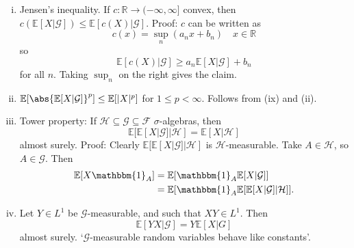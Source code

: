 \documentclass{article}
\newcommand{\G}{\mathcal{G}}
\newcommand{\1}[1]{\mathbbm{1}_{#1}}
\newcommand{\E}{\mathbb{E}}
\begin{document}
\begin{enumerate}[(i)]
  \item Jensen's inequality. If $c: \mathbb{R} \to (-\infty, \infty]$ convex, then $c(\E[X | \G]) \leq \E[c(X) | \G]$. Proof: $c$ can be written as
    \begin{equation*}
      c(x) = \sup_n (a_n x + b_n) \quad x \in \mathbb{R}
    \end{equation*}
    so
    \begin{equation*}
      \E[c(X) | \G] \geq a_n \E[X | \G] + b_n
    \end{equation*}
    for all $n$.
    Taking $\sup_n$ on the right gives the claim.
  \item $\E[\abs{\E[X|\G]}^p] \leq \E[|X|^p]$ for $1 \leq p < \infty$. Follows from (ix) and (ii).
  \item Tower property: If $\mathcal{H} \subseteq \mathcal{G} \subseteq \mathcal{F}$ $\sigma$-algebras, then
    \begin{equation*}
    \E[\E[X|\G] | \mathcal{H}] = \E[X | \mathcal{H}]
    \end{equation*}
    almost surely.
    Proof: Clearly $\E[\E[X|\G] | \mathcal{H}]$ is $\mathcal{H}$-measurable.
    Take $A \in \mathcal{H}$, so $A \in \G$. Then
    \begin{align*}
      \E[X\1A] &= \E[\1A \E[X|\G]] \\
               &= \E[\1A \E[\E[X|\G] | \mathcal{H}]].
    \end{align*}
  \item Let $Y \in L^1$ be $\G$-measurable, and such that $XY \in L^1$. Then
    \begin{equation*}
      \E[YX | \G] = Y \E[X | G]
    \end{equation*}
    almost surely. `$\G$-measurable random variables behave like constants'.


\end{enumerate}
\end{document}
